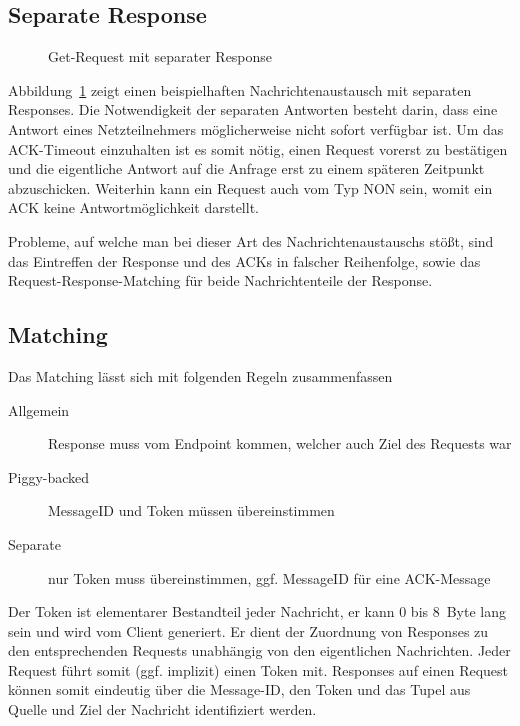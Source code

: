 \subsection{Separate Response}
\label{seperateResponse}
\begin{figure}[htbp]
    \centering
    \begin{minipage}{0.75\textwidth}
    
    \caption{Get-Request mit separater Response}
    \end{minipage}
    \label{fig:confirmableRequest_separateResponse}
\end{figure}

Abbildung~\ref{fig:confirmableRequest_separateResponse} zeigt einen beispielhaften
Nachrichtenaustausch mit separaten Responses.
Die Notwendigkeit der separaten Antworten besteht darin, dass eine Antwort eines Netzteilnehmers
möglicherweise nicht sofort verfügbar ist.
Um das \ac{ACK}-Timeout einzuhalten ist es somit nötig, einen Request vorerst zu bestätigen
und die eigentliche Antwort auf die Anfrage erst zu einem späteren Zeitpunkt abzuschicken.
Weiterhin kann ein Request auch vom Typ \ac{NON} sein, womit ein \ac{ACK} keine
Antwortmöglichkeit darstellt.

Probleme, auf welche man bei dieser Art des Nachrichtenaustauschs stößt, sind das Eintreffen der
Response und des \ac{ACK}s in falscher Reihenfolge, sowie das Request-Response-Matching für
beide Nachrichtenteile der Response.

\subsection{Matching}
\label{Matching}
Das Matching lässt sich mit folgenden Regeln zusammenfassen
\begin{description}
    \item[Allgemein] Response muss vom Endpoint kommen, welcher auch Ziel des Requests war
    \item[Piggy-backed] MessageID und Token müssen übereinstimmen
    \item[Separate] nur Token muss übereinstimmen, ggf. MessageID für eine ACK-Message
\end{description}
Der Token ist elementarer Bestandteil jeder Nachricht, er kann 0 bis 8~Byte lang sein und wird
vom Client generiert.
Er dient der Zuordnung von Responses zu den entsprechenden Requests unabhängig von den
eigentlichen Nachrichten.
Jeder Request führt somit (ggf. implizit) einen Token mit.
Responses auf einen Request können somit eindeutig über die Message-ID, den Token und das Tupel aus
Quelle und Ziel der Nachricht identifiziert werden.

